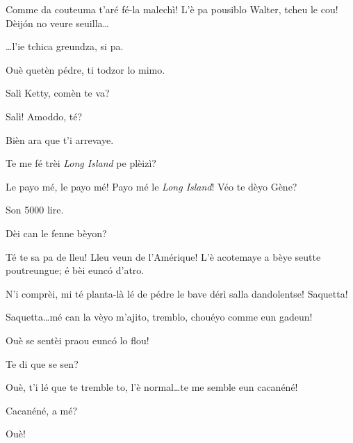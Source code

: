 \begin{drama}
\Kettyspeaks Comme da couteuma t’aré fé-la  malechì! L'è pa pousiblo Walter, tcheu le cou! Dèij\'on no veure seuilla\ldots


\Walterspeaks \ldots l'ie tchica greundza, si pa.

\Kettyspeaks Ouè quetèn pédre, ti todzor lo mimo.


\Selmospeaks 	{} Salì Ketty, comèn te va? 

\Kettyspeaks{} Salì! Amoddo, té?

\Selmospeaks Bièn ara que t'i arrevaye.

\Kettyspeaks {} Te me fé trèi \textit{Long Island} pe plèizì?


\Selmospeaks Le payo mé, le payo mé! Payo mé le \textit{Long Island}! Véo te dèyo Gène?

\Genespeaks Son 5000 lire.


\Walterspeaks{} Dèi can le fenne bèyon?

\Selmospeaks Té te sa pa de lleu! Lleu veun de l'Amérique! L'è acotemaye a bèye seutte poutreungue; é bèi eunc\'o d'atro.


\Walterspeaks	N'i comprèi, mi té planta-là lé de pédre le bave dérì salla dandolentse! Saquetta!

\Selmospeaks{} Saquetta\ldots mé can la vèyo m'ajito, tremblo, chouéyo comme eun gadeun!

\Walterspeaks	Ouè se sentèi praou eunc\'o lo flou!

\Selmospeaks{} Te di que se sen?

\Walterspeaks Ouè, t'i lé que te tremble to, l'è normal\ldots te me semble eun cacanéné!

\Selmospeaks{} Cacanéné, a mé? 	

\Walterspeaks Ouè!


\end{drama}
